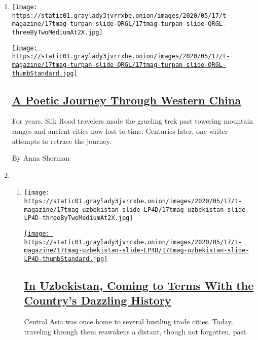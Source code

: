 \begin{enumerate}
\def\labelenumi{\arabic{enumi}.}
\item
  \texttt{[image: https://static01.graylady3jvrrxbe.onion/images/2020/05/17/t-magazine/17tmag-turpan-slide-QRGL/17tmag-turpan-slide-QRGL-threeByTwoMediumAt2X.jpg]}

  \href{/2020/05/11/t-magazine/china-desert.html}{\texttt{[image: https://static01.graylady3jvrrxbe.onion/images/2020/05/17/t-magazine/17tmag-turpan-slide-QRGL/17tmag-turpan-slide-QRGL-thumbStandard.jpg]}}

  \hypertarget{a-poetic-journey-through-western-china}{%
  \subsection{\texorpdfstring{\href{/2020/05/11/t-magazine/china-desert.html}{A
  Poetic Journey Through Western
  China}}{A Poetic Journey Through Western China}}\label{a-poetic-journey-through-western-china}}

  For years, Silk Road travelers made the grueling trek past towering
  mountain ranges and ancient cities now lost to time. Centuries later,
  one writer attempts to retrace the journey.

  By Anna Sherman
\item
  \begin{enumerate}
  \def\labelenumii{\arabic{enumii}.}
  \item
    \texttt{[image: https://static01.graylady3jvrrxbe.onion/images/2020/05/17/t-magazine/17tmag-uzbekistan-slide-LP4D/17tmag-uzbekistan-slide-LP4D-threeByTwoMediumAt2X.jpg]}

    \href{/2020/05/11/t-magazine/uzbekistan-history-silk-road.html}{\texttt{[image: https://static01.graylady3jvrrxbe.onion/images/2020/05/17/t-magazine/17tmag-uzbekistan-slide-LP4D/17tmag-uzbekistan-slide-LP4D-thumbStandard.jpg]}}

    \hypertarget{in-uzbekistan-coming-to-terms-with-the-countrys-dazzling-history}{%
    \subsection{\texorpdfstring{\href{/2020/05/11/t-magazine/uzbekistan-history-silk-road.html}{In
    Uzbekistan, Coming to Terms With the Country's Dazzling
    History}}{In Uzbekistan, Coming to Terms With the Country's Dazzling History}}\label{in-uzbekistan-coming-to-terms-with-the-countrys-dazzling-history}}

    Central Asia was once home to several bustling trade cities. Today,
    traveling through them reawakens a distant, though not forgotten,
    past.


\end{enumerate}
\end{enumerate}
